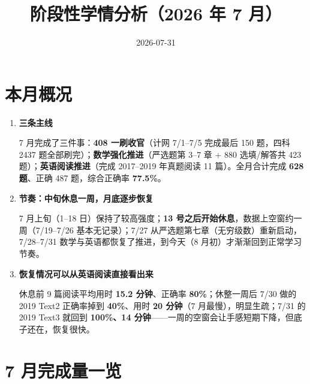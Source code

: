 \documentclass[12pt,a4paper]{ctexart}
\title{\textbf{阶段性学情分析（2026 年 7 月）}}
\author{2026-07-31}
\date{}
\begin{document}
\maketitle
\thispagestyle{empty}
\newpage
\tableofcontents
\newpage

\section{本月概况}

\begin{enumerate}[leftmargin=*,itemsep=6pt]
    \item \textbf{三条主线}

    7 月完成了三件事：\textbf{408 一刷收官}（计网 7/1--7/5 完成最后 150 题，四科 2437 题全部刷完）；\textbf{数学强化推进}（严选题第 3--7 章 + 880 选填/解答共 423 题）；\textbf{英语阅读推进}（完成 2017--2019 年真题阅读 11 篇）。全月合计完成 \textbf{628 题}、正确 487 题，综合正确率 \textbf{77.5\%}。

    \item \textbf{节奏：中旬休息一周，月底逐步恢复}

    7 月上旬（1--18 日）保持了较高强度；\textbf{13 号之后开始休息}，数据上空窗约一周（7/19--7/26 基本无记录）；7/27 从严选题第七章（无穷级数）重新启动，7/28--7/31 数学与英语都恢复了推进，到今天（8 月初）才渐渐回到正常学习节奏。

    \item \textbf{恢复情况可以从英语阅读直接看出来}

    休息前 9 篇阅读平均用时 \textbf{15.2 分钟}、正确率 \textbf{80\%}；休整一周后 7/30 做的 2019 Text2 正确率掉到 \textbf{40\%}、用时 \textbf{20 分钟}（7 月最慢），明显生疏；7/31 的 2019 Text3 就回到 \textbf{100\%、14 分钟}——一周的空窗会让手感短期下降，但底子还在，恢复很快。

\end{enumerate}

\section{7 月完成量一览}
\end{document}
